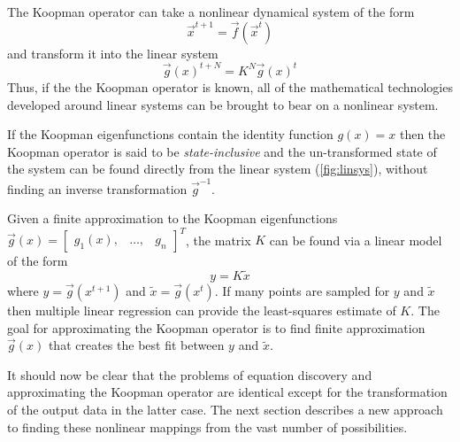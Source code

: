 \documentclass{article}
\begin{document}
The Koopman operator can take a nonlinear dynamical system of the form
\begin{equation}
\vec{x}^{t+1} = \vec{f}(\vec{x}^t)
\end{equation}
and transform it into the linear system
\begin{equation}
\label{fig:linsys}
\vec{g}(x)^{t+N} = K^N \vec{g}(x)^{t}
\end{equation}
Thus, if the the Koopman operator is known, all of the mathematical technologies developed around linear systems can be brought to bear on a nonlinear system. 

If the Koopman eigenfunctions contain the identity function $g(x) = x$ then the Koopman operator is said to be \emph{state-inclusive} and the un-transformed state of the system can be found directly from the linear system (\ref{fig:linsys}), without finding an inverse transformation $\vec{g}^{-1}$.

Given a finite approximation to the Koopman eigenfunctions $\vec{g}(x) = \begin{bmatrix} g_1(x), & \hdots, & g_n \end{bmatrix}^T$, the matrix $K$ can be found via a linear model of the form 
\[ y = K \tilde{x} \]
where $y = \vec{g}(x^{t+1})$ and $\tilde{x} = \vec{g}(x^t)$. If many points are sampled for $y$ and $\tilde{x}$ then multiple linear regression can provide the least-squares estimate of $K$. The goal for approximating the Koopman operator is to find finite approximation $\vec{g}(x)$ that creates the best fit between $y$ and $\tilde{x}$.

It should now be clear that the problems of equation discovery and approximating the Koopman operator are identical except for the transformation of the output data in the latter case. The next section describes a new approach to finding these nonlinear mappings from the vast number of possibilities.
\end{document}
